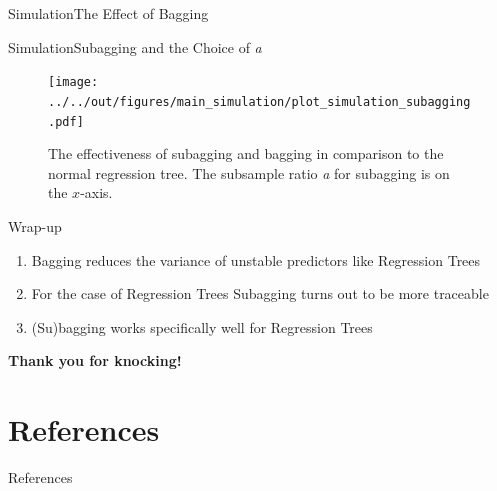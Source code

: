 \documentclass{beamer}
\begin{document}
\begin{frame}{Simulation}{The Effect of Bagging}
\begin{table}
\resizebox{11cm}{!}{

}
\caption{The effect of bagging using regression trees. The relative error is defined as $(MSE_{\text{Tree}} - MSE_{\text{Bagging}})/ MSE_{\text{Bagging}}$.}
\end{table}

\end{frame}


\begin{frame}{Simulation}{Subagging and the Choice of \textit{a}}
\begin{center}
\begin{figure}
\texttt{[image: ../../out/figures/main\_simulation/plot\_simulation\_subagging.pdf]}
\caption{The effectiveness of subagging and bagging in comparison to the normal regression tree. The subsample ratio \textit{a} for subagging is on the $x$-axis.}
\end{figure}
\end{center}
\end{frame}


\begin{frame}{Wrap-up}
\begin{enumerate}
\item Bagging reduces the variance of unstable predictors like Regression Trees
\item For the case of Regression Trees Subagging turns out to be more traceable
\item (Su)bagging works specifically well for Regression Trees
\end{enumerate}
\end{frame}

\begin{frame}
\begin{center}
\textbf{Thank you for knocking!
}\end{center}

\end{frame}



\section{References}
\begin{frame}{References}


\end{frame}
\end{document}
